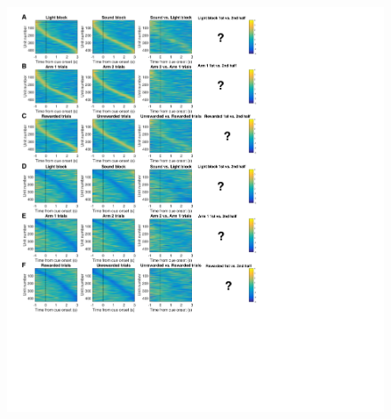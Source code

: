\documentclass[11pt]{article}
\begin{document}
\begin{figure}[h]
\centering
\includegraphics[width=\textwidth]{Fig 8 - Task tiling.png}

\end{figure}
\end{document}
